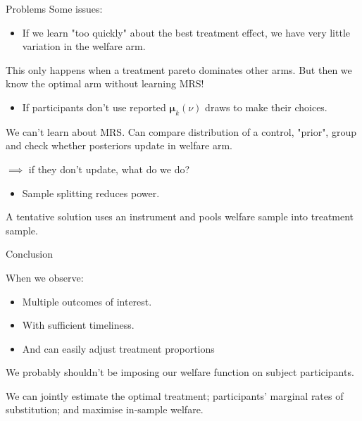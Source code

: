 \documentclass[aspectratio=169,xcolor=dvipsnames]{beamer}
\begin{document}
\begin{frame}{Problems}
    Some issues:
    \begin{itemize}
        \item If we learn "too quickly" about the best treatment effect, we have 
        very little variation in the welfare arm.
    \end{itemize}

    This only happens when a treatment pareto dominates other arms. But then 
    we know the optimal arm without learning MRS!

    \begin{itemize}
        \item If participants don't use reported $\bm{\mu}_k(\nu)$ draws to 
        make their choices.
    \end{itemize}

    We can't learn about MRS. Can compare distribution of a control, "prior", group and 
    check whether posteriors update in welfare arm.


    $\implies$ if they don't update, what do we do?

    \begin{itemize}
        \item Sample splitting reduces power.
    \end{itemize}

    A tentative solution uses an instrument and pools welfare sample into treatment 
    sample.
    

\end{frame}


\begin{frame}{Conclusion}

    When we observe:

    \begin{itemize}
        \item Multiple outcomes of interest.
        \item With sufficient timeliness.
        \item And can easily adjust treatment proportions
    \end{itemize}

    We probably shouldn't be imposing our welfare function on 
    subject participants.
    

\parskip=20pt

    We can jointly estimate the optimal treatment; participants' marginal rates of substitution;
     and maximise in-sample welfare.


    

\end{frame}
\end{document}
